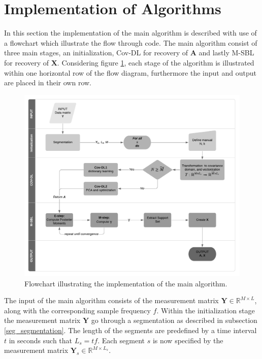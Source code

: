 \section{Implementation of Algorithms}
In this section the implementation of the main algorithm is described with use of a flowchart which illustrate the flow through code.
The main algorithm consist of three main stages, an initialization, Cov-DL for recovery of $\mathbf{A}$ and lastly M-SBL for recovery of $\mathbf{X}$. 
Considering figure \ref{fig:flow}, each stage of the algorithm is illustrated within one horizontal row of the flow diagram, furthermore the input and output are placed in their own row.    
\begin{figure}[H]
\centering
\includegraphics[scale=0.8]{figures/ch_6/baseline_flowchart.png}
\caption{Flowchart illustrating the implementation of the main algorithm.}
\label{fig:flow}
\end{figure}
\noindent {}
The input of the main algorithm consists of the measurement matrix $\mathbf{Y} \in \mathbb{R}^{M \times L}$, along with the corresponding sample frequency $f$. 
Within the initialization stage the measurement matrix $\mathbf{Y}$ go through a segmentation as described in subsection \ref{seg_segmentation}. 
The length of the segments are predefined by a time interval $t$ in seconds such that $L_{s} = tf$. 
Each segment $s$ is now specified by the measurement matrix $\mathbf{Y}_s \in \mathbb{R}^{M \times L_{s}}$.

